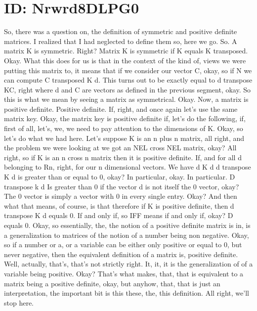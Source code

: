 \documentclass[10pt]{article}
\begin{document}
\section*{ID: Nrwrd8DLPG0}
So, there was a question on, the definition of symmetric and positive definite matrices. I realized that I had neglected to define them so, here we go. So. A matrix K is symmetric. Right? Matrix K is symmetric if K equals K transposed. Okay. What this does for us is that in the context of the kind of, views we were putting this matrix to, it means that if we consider our vector C, okay, so if N we can compute C transposed K d. This turns out to be exactly equal to d transpose KC, right where d and C are vectors as defined in the previous segment, okay. So this is what we mean by seeing a matrix as symmetrical. Okay. Now, a matrix is positive definite. Positive definite. If, right, and once again let's use the same matrix key. Okay, the matrix key is positive definite if, let's do the following, if, first of all, let's, we, we need to pay attention to the dimensions of K. Okay, so let's do what we had here. Let's suppose K is an n plus n matrix, all right, and the problem we were looking at we got an NEL cross NEL matrix, okay? All right, so if K is an n cross n matrix then it is positive definite. If, and for all d belonging to Rn, right, for our n dimensional vectors. We have d K d d transpose K d is greater than or equal to 0, okay? In particular, okay. In particular. D transpose k d Is greater than 0 if the vector d is not itself the 0 vector, okay? The 0 vector is simply a vector with 0 in every single entry. Okay? And then what that means, of course, is that therefore if K is positive definite, then d transpose K d equals 0. If and only if, so IFF means if and only if, okay? D equals 0. Okay, so essentially, the, the notion of a positive definite matrix is in, is a generalization to matrices of the notion of a number being non negative. Okay, so if a number or a, or a variable can be either only positive or equal to 0, but never negative, then the equivalent definition of a matrix is, positive definite. Well, actually, that's, that's not strictly right. It, it, it is the generalization of of a variable being positive. Okay? That's what makes, that, that is equivalent to a matrix being a positive definite, okay, but anyhow, that, that is just an interpretation, the important bit is this these, the, this definition. All right, we'll stop here.
\end{document}
